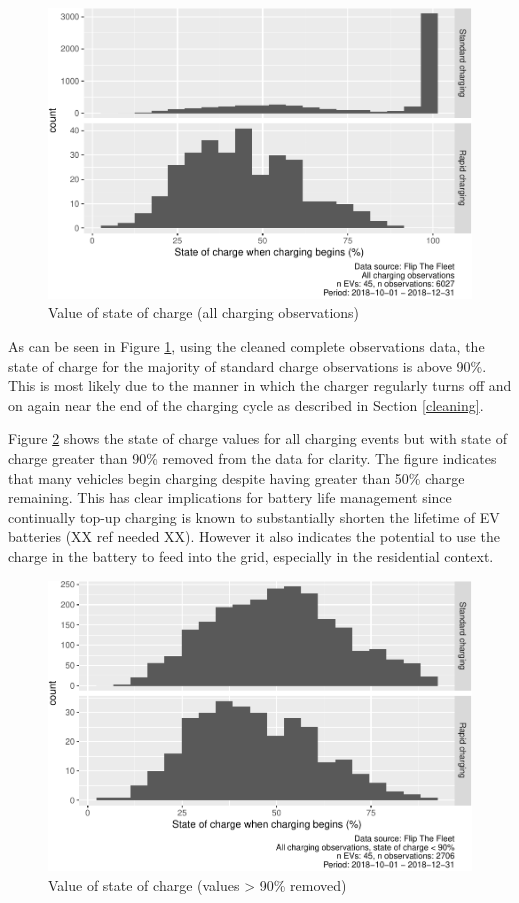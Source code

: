 \documentclass[]{article}
\begin{document}
\begin{figure}
\centering
\includegraphics{EVBB_report_v1_files/figure-latex/SoCplot1-1.pdf}
\caption{\label{fig:SoCplot1}Value of state of charge (all charging observations)}
\end{figure}

As can be seen in Figure \ref{fig:SoCplot1}, using the cleaned complete observations data, the state of charge for the majority of standard charge observations is above 90\%. This is most likely due to the manner in which the charger regularly turns off and on again near the end of the charging cycle as described in Section \ref{cleaning}.

Figure \ref{fig:SoCplot2} shows the state of charge values for all charging events but with state of charge greater than 90\% removed from the data for clarity. The figure indicates that many vehicles begin charging despite having greater than 50\% charge remaining. This has clear implications for battery life management since continually top-up charging is known to substantially shorten the lifetime of EV batteries (XX ref needed XX). However it also indicates the potential to use the charge in the battery to feed into the grid, especially in the residential context.

\begin{figure}
\centering
\includegraphics{EVBB_report_v1_files/figure-latex/SoCplot2-1.pdf}
\caption{\label{fig:SoCplot2}Value of state of charge (values \textgreater{} 90\% removed)}
\end{figure}
\end{document}
